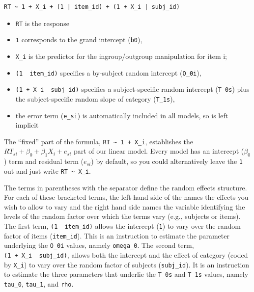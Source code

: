 \documentclass[
  english,
  doc,floatsintext]{apa6}
\providecommand{\tightlist}{%
  \setlength{\itemsep}{0pt}\setlength{\parskip}{0pt}}
\begin{document}
\begin{verbatim}
RT ~ 1 + X_i + (1 | item_id) + (1 + X_i | subj_id)
\end{verbatim}

\begin{itemize}
\tightlist
\item
  \texttt{RT} is the response
\item
  \texttt{1} corresponds to the grand intercept (\texttt{b0}),
\item
  \texttt{X\_i} is the predictor for the ingroup/outgroup manipulation for item i;
\item
  \texttt{(1\ \textbar{}\ item\_id)} specifies a by-subject random intercept (\texttt{O\_0i}),
\item
  \texttt{(1\ +\ X\_i\ \textbar{}\ subj\_id)} specifies a subject-specific random intercept (\texttt{T\_0s}) plus the subject-specific random slope of category (\texttt{T\_1s}),
\item
  the error term (\texttt{e\_si}) is automatically included in all models, so is left implicit
\end{itemize}

The \enquote{fixed} part of the formula, \texttt{RT\ \textasciitilde{}\ 1\ +\ X\_i}, establishes the \(RT_{si} + \beta_0 + \beta_1 X_i + e_{si}\) part of our linear model. Every model has an intercept (\(\beta_0\)) term and residual term (\(e_{si}\)) by default, so you could alternatively leave the \texttt{1} out and just write \texttt{RT\ \textasciitilde{}\ X\_i}.

The terms in parentheses with the \texttt{\textbar{}} separator define the random effects structure. For each of these bracketed terms, the left-hand side of the \texttt{\textbar{}} names the effects you wish to allow to vary and the right hand side names the variable identifying the levels of the random factor over which the terms vary (e.g., subjects or items). The first term, \texttt{(1\ \textbar{}\ item\_id)} allows the intercept (\texttt{1}) to vary over the random factor of items (\texttt{item\_id}). This is an instruction to estimate the parameter underlying the \texttt{O\_0i} values, namely \texttt{omega\_0}. The second term, \texttt{(1\ +\ X\_i\ \textbar{}\ subj\_id)}, allows both the intercept and the effect of category (coded by \texttt{X\_i}) to vary over the random factor of subjects (\texttt{subj\_id}). It is an instruction to estimate the three parameters that underlie the \texttt{T\_0s} and \texttt{T\_1s} values, namely \texttt{tau\_0}, \texttt{tau\_1}, and \texttt{rho}.
\end{document}
